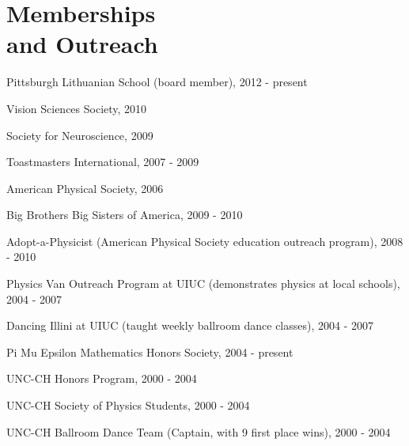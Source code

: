 \section{\sc Memberships\\and Outreach} %
\begin{list2}
\item[-] Pittsburgh Lithuanian School (board member), 2012 - present
\item[-] Vision Sciences Society, 2010 
\item[-] Society for Neuroscience, 2009 
\item[-] Toastmasters International, 2007 - 2009
\item[-] American Physical Society, 2006 
\item[-] Big Brothers Big Sisters of America, 2009 - 2010
\item[-] Adopt-a-Physicist (American Physical Society education outreach program), 2008 - 2010
\item[-] Physics Van Outreach Program at UIUC (demonstrates physics at local schools), 2004 - 2007
\item[-] Dancing Illini at UIUC (taught weekly ballroom dance classes), 2004 - 2007
\item[-] Pi Mu Epsilon Mathematics Honors Society, 2004 - present
\item[-] UNC-CH Honors Program, 2000 - 2004
\item[-] UNC-CH Society of Physics Students, 2000 - 2004
\item[-] UNC-CH Ballroom Dance Team (Captain, with 9 first place wins), 2000 - 2004
\end{list2}

